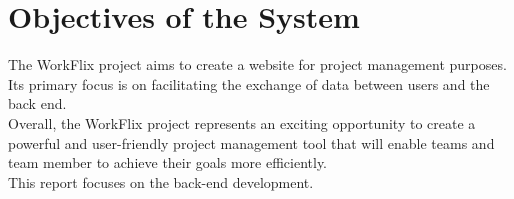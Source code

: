\section{Objectives of the System}
The WorkFlix project aims to create a website for project management purposes. Its primary focus is on facilitating the exchange of data between users and the back end.\\
Overall, the WorkFlix project represents an exciting opportunity to create a powerful and user-friendly project management tool that will enable teams and team member to achieve their goals more efficiently.\\
This report focuses on the back-end development.\\